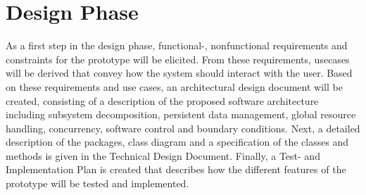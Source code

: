 \section{Design Phase}
As a first step in the design phase, functional-, nonfunctional requirements and constraints for the prototype will be elicited. From these requirements, usecases will be derived that convey how the system should interact with the user. Based on these requirements and use cases, an architectural design document will be created, consisting of a description of the proposed software architecture including subsystem decomposition, persistent data management, global resource handling, concurrency, software control and boundary conditions. Next, a detailed description of the packages, class diagram and a specification of the classes and methods is given in the Technical Design Document. Finally, a Test- and Implementation Plan is created that describes how the different features of the prototype will be tested and implemented.


